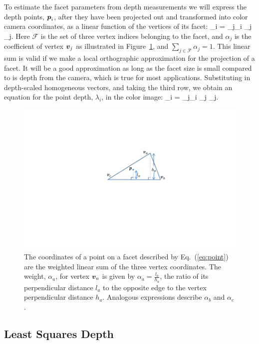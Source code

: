 To estimate the facet parameters from depth measurements we will express the depth points, $\boldsymbol{p}_i$, after they have been projected out and transformed into color camera coordinates, as a linear function of the vertices of its facet:
\beq  %
\point_i = \sum_{j\in{}_i} \alpha_j \vertex_j. \label{eq:point}
\eeq
Here $\mathcal{F}$ is the set of three vertex indices belonging to the facet, and $\alpha_j$ is the coefficient of vertex $\boldsymbol{v}_j$ as illustrated in Figure~\ref{fig:triangle}, and $\sum_{j\in\mathcal{F}}\alpha_j=1$.  This linear sum is valid if we make a local orthographic approximation for the projection of a facet.  It will be a good approximation as long as the facet size is small compared to is depth from the camera, which is true for most applications.  Substituting in depth-scaled homogeneous vectors, and taking the third row, we obtain an equation for the point depth, $\lambda_i$, in the color image:
\beq
\lambda_i = \sum_{j\in{}_i} \alpha_j \lambda_j. \label{eq:pointdepth}
\eeq

\begin{figure}
\begin{center}
   \includegraphics[trim=150 140 140 80,clip,width=0.75\linewidth]{Figures/TriangleParameterization}
\end{center}
   \caption{The coordinates of a point on a facet described by Eq.~(\ref{eq:point}) are the weighted linear sum of the three vertex coordinates.  The weight, $\alpha_a$, for vertex $\boldsymbol{v}_a$ is given by $\alpha_a = \frac{l_a}{h_a}$, the ratio of its perpendicular distance $l_a$ to the opposite edge to the vertex perpendicular distance $h_a$.  Analogous expressions describe $\alpha_b$ and $\alpha_c$. }
\label{fig:triangle}
\end{figure}

\subsection{Least Squares Depth}

